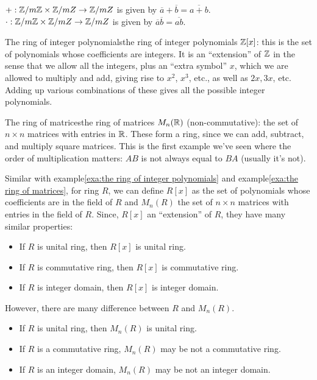 $+: \mathbb{Z}/m\mathbb{Z} \times \mathbb{Z}/mZ\rightarrow \mathbb{Z}/mZ$ is given by $\overline{a}+\overline{b}=\overline{a+b}$. 
$\cdot: \mathbb{Z}/m\mathbb{Z} \times \mathbb{Z}/mZ\rightarrow \mathbb{Z}/mZ$ is given by $\overline{a}\overline{b}=\overline{ab}$.

\begin{example}{The ring of integer polynomials}{the ring of integer polynomials}
    $\mathbb{Z}[x]$: this is the set of polynomials whose coefficients are integers. It is an “extension” of $\mathbb{Z}$ in the
sense that we allow all the integers, plus an “extra symbol” $x$, which we are allowed to multiply
and add, giving rise to $x^2$, $x^3$, etc., as well as $2x, 3x$, etc.
Adding up various combinations of these gives all the possible integer polynomials.
\end{example}

\begin{example}{The ring of matrices}{the ring of matrices}
    $M_n(\mathbb{R})$ (non-commutative): the set of $n \times n$ matrices with entries in $\mathbb{R}$. These form a ring, since
we can add, subtract, and multiply square matrices. This is the first example we've seen where
the order of multiplication matters: $AB$ is not always equal to $BA$ (usually it's not).
\end{example}


\begin{remark}
    Similar with example\ref{exa:the ring of integer polynomials} and example\ref{exa:the ring of matrices}, for ring $R$, we can define $R[x]$ as 
    the set of polynomials whose coefficients are in the field of $R$ and $M_n(R)$ the set of $n\times n$ matrices with entries in the field of $R$.
     Since, $R[x]$ an “extension” of $R$, they have many similar properties:
    \begin{itemize}
        \item If $R$ is unital ring, then $R[x]$ is unital ring.
        \item If $R$ is commutative ring, then $R[x]$ is commutative ring. 
        \item If $R$ is integer domain, then $R[x]$ is integer domain. 
    \end{itemize}
    However, there are many difference between $R$ and $M_n(R)$.
    \begin{itemize}
        \item If $R$ is unital ring, then $M_n(R)$ is unital ring.
        \item If $R$ is a commutative ring, $M_n(R)$ may be not a commutative ring. 
        \item If $R$ is an integer domain, $M_n(R)$ may be not an  integer domain. 
    \end{itemize}
\end{remark}

